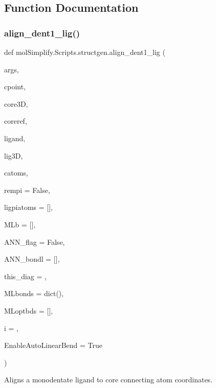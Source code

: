 \subsection{Function Documentation}
\mbox{\label{namespacemolSimplify_1_1Scripts_1_1structgen_a91f6c3dc244887d2e71cdfa122ee7993}} 
\subsubsection{\texorpdfstring{align\+\_\+dent1\+\_\+lig()}{align\_dent1\_lig()}}
{\footnotesize\ttfamily def mol\+Simplify.\+Scripts.\+structgen.\+align\+\_\+dent1\+\_\+lig (\begin{DoxyParamCaption}\item[{}]{args,  }\item[{}]{cpoint,  }\item[{}]{core3D,  }\item[{}]{coreref,  }\item[{}]{ligand,  }\item[{}]{lig3D,  }\item[{}]{catoms,  }\item[{}]{rempi = {\ttfamily False},  }\item[{}]{ligpiatoms = {\ttfamily \mbox{[}\mbox{]}},  }\item[{}]{M\+Lb = {\ttfamily \mbox{[}\mbox{]}},  }\item[{}]{A\+N\+N\+\_\+flag = {\ttfamily False},  }\item[{}]{A\+N\+N\+\_\+bondl = {\ttfamily \mbox{[}\mbox{]}},  }\item[{}]{this\+\_\+diag = {},  }\item[{}]{M\+Lbonds = {\ttfamily dict()},  }\item[{}]{M\+Loptbds = {\ttfamily \mbox{[}\mbox{]}},  }\item[{}]{i = {},  }\item[{}]{Enable\+Auto\+Linear\+Bend = {\ttfamily True} }\end{DoxyParamCaption})}



Aligns a monodentate ligand to core connecting atom coordinates. 


